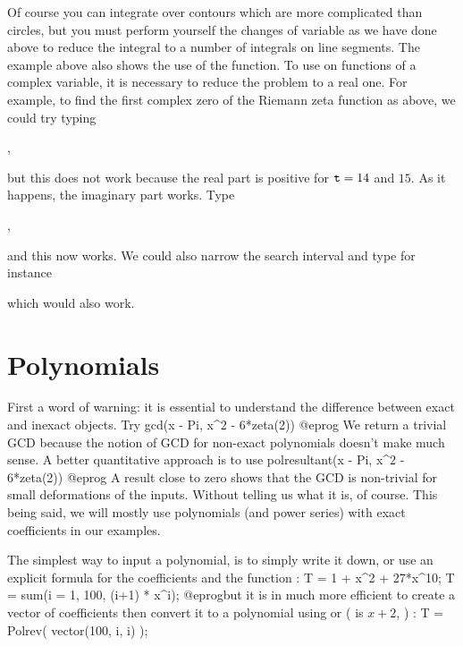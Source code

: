 Of course you can integrate over contours which are more complicated than
circles, but you must perform yourself the changes of variable as we have
done above to reduce the integral to a number of integrals on line segments.
\smallskip
%
The example above also shows the use of the  function. To use
 on functions of a complex variable, it is necessary to reduce the
problem to a real one. For example, to find the first complex zero of the
Riemann zeta function as above, we could try typing

,

\noindent but this does not work because the real part is positive for
${\tt t}=14$ and $15$. As it happens, the imaginary part works. Type

,

\noindent and this now works. We could also narrow the search interval and
type for instance


\noindent which would also work.

\section{Polynomials}

First a word of warning: it is essential to understand the difference between
exact and inexact objects. Try
\bprog
  gcd(x - Pi, x^2 - 6*zeta(2))
@eprog\noindent
We return a trivial GCD because the notion of GCD for non-exact polynomials
doesn't make much sense. A better quantitative approach is to use
\bprog
  polresultant(x - Pi, x^2 - 6*zeta(2))
@eprog\noindent
A result close to zero shows that the GCD is non-trivial for small
deformations of the inputs. Without telling us what it is, of course. This
being said, we will mostly use polynomials (and power series) with exact
coefficients in our examples.\smallskip

The simplest way to input a polynomial, is to simply write it down,
or use an explicit formula for the coefficients and the function :
\bprog
  T = 1 + x^2 + 27*x^10;
  T = sum(i = 1, 100, (i+1) * x^i);
@eprog\noindent but it is in much more efficient to create a vector of
coefficients then convert it to a polynomial using  or 
( is $x+2$, ) :
\bprog
  T = Polrev( vector(100, i, i) );

